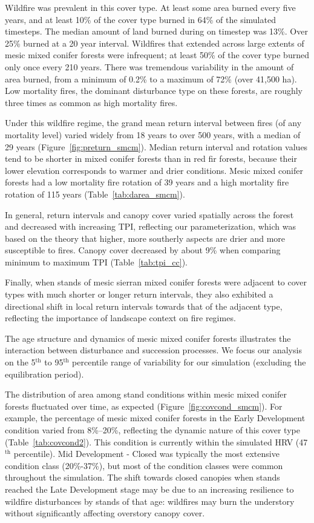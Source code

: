Wildfire was prevalent in this cover type. At least some area burned every five years, and at least 10\% of the cover type burned in 64\% of the simulated timesteps. The median amount of land burned during on timestep was 13\%. Over 25\% burned at a 20 year interval. Wildfires that extended across large extents of mesic mixed conifer forests were infrequent; at least 50\% of the cover type burned only once every 210 years. There was tremendous variability in the amount of area burned, from a minimum of 0.2\% to a maximum of 72\% (over 41,500 ha). Low mortality fires, the dominant disturbance type on these forests, are roughly three times as common as high mortality fires.

Under this wildfire regime, the grand mean return interval between fires (of any mortality level) varied widely from 18 years to over 500 years, with a median of 29 years (Figure~\ref{fig:preturn_smcm}). Median return interval and rotation values tend to be shorter in mixed conifer forests than in red fir forests, because their lower elevation corresponds to warmer and drier conditions. Mesic mixed conifer forests had a low mortality fire rotation of 39 years and a high mortality fire rotation of 115 years (Table~\ref{tab:darea_smcm}). 

In general, return intervals and canopy cover varied spatially across the forest and decreased with increasing TPI, reflecting our parameterization, which was based on the theory that higher, more southerly aspects are drier and more susceptible to fires. Canopy cover decreased by about 9\% when comparing minimum to maximum TPI (Table~\ref{tab:tpi_cc}). 

Finally, when stands of mesic sierran mixed conifer forests were adjacent to cover types with much shorter or longer return intervals, they also exhibited a directional shift in local return intervals towards that of the adjacent type, reflecting the importance of landscape context on fire regimes.

The age structure and dynamics of mesic mixed conifer forests illustrates the interaction between disturbance and succession processes. We focus our analysis on the 5$^{\text{th}}$ to 95$^{\text{th}}$ percentile range of variability for our simulation (excluding the equilibration period).

The distribution of area among stand conditions within mesic mixed conifer forests fluctuated over time, as expected (Figure~\ref{fig:covcond_smcm}). For example, the percentage of mesic mixed conifer forests in the Early Development condition varied from 8\%--20\%, reflecting the dynamic nature of this cover type (Table~\ref{tab:covcond2}). This condition is currently within the simulated HRV (47$^{\text{th}}$ percentile). Mid Development - Closed was typically the most extensive condition class (20\%-37\%), but most of the condition classes were common throughout the simulation. The shift towards closed canopies when stands reached the Late Development stage may be due to an increasing resilience to wildfire disturbances by stands of that age: wildfires may burn the understory without significantly affecting overstory canopy cover.


